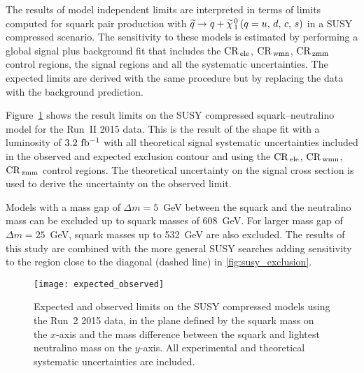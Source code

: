 The results of model independent limits are interpreted in terms of limits
computed for squark pair production with $\widetilde{q} \rightarrow q + \widetilde{\chi}_{\, 1}^{\, 0}\, (q = u,\, d,\, c,\, s)$ in a SUSY compressed
scenario. The sensitivity to these models is estimated by performing a global
signal plus background fit that includes the $\mathrm{CR}_\mathrm{\, ele}$, $\mathrm{CR}_\mathrm{\, wmn}$, $\mathrm{CR}_\mathrm{\, zmm}$
control regions, the signal regions and all the systematic uncertainties. The
expected limits are derived with the same procedure but by replacing the data
with the background prediction.

Figure~\ref{fig:expected_observed} shows the result limits on the SUSY
compressed squark--neutralino model for the Run~II 2015 data. This is the result
of the shape fit with a luminosity of $3.2~\mbox{fb$^{-1}$}$ with all theoretical signal
systematic uncertainties included in the observed and expected exclusion contour
and using the $\mathrm{CR}_\mathrm{\, ele}$, $\mathrm{CR}_\mathrm{\, wmn}$, $\mathrm{CR}_\mathrm{\, zmm}$ control regions. The theoretical
uncertainty on the signal cross section is used to derive the uncertainty on the
observed limit.

Models with a mass gap of $\Delta m = 5$~GeV between the squark and the
neutralino mass can be excluded up to squark masses of 608~GeV. For larger mass
gap of $\Delta m = 25$~GeV, squark masses up to 532~GeV are also excluded. The
results of this study are combined with the more general SUSY searches adding
sensitivity to the region close to the diagonal (dashed line) in
\cref{fig:susy_exclusion}.


\begin{figure}[!h]
  \centering
    \texttt{[image: expected\_observed]}
    \caption{Expected and observed limits on the SUSY compressed models using
      the Run~2 2015 data, in the plane defined by the squark mass on the
      $x$-axis and the mass difference between the squark and lightest
      neutralino mass on the $y$-axis. All experimental and theoretical
      systematic uncertainties are included.}
    \label{fig:expected_observed}
\end{figure}
